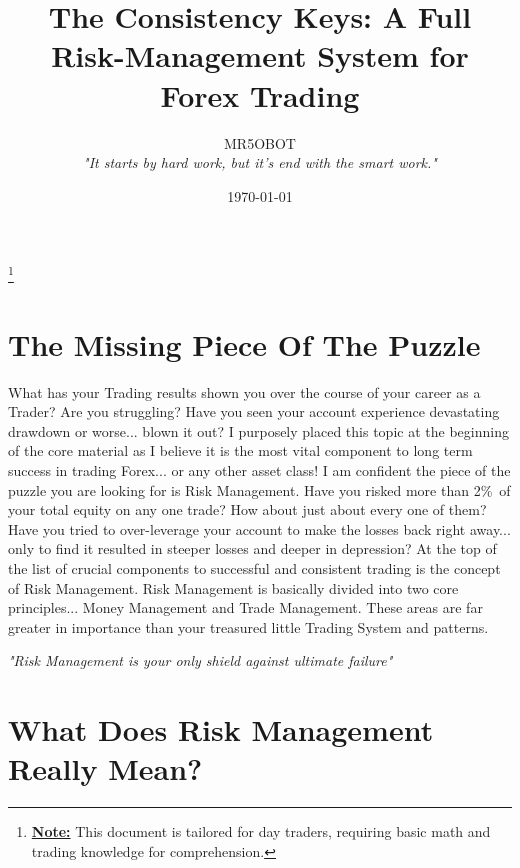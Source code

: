 \documentclass[10pt] {article}
\title{The Consistency Keys: A  Full Risk-Management System for Forex Trading}
\author{MR5OBOT \\ \textit{"It starts by hard work, but it's end with the smart work."}}
\begin{document}
\date{\today}
\maketitle
\pagestyle{fancy}
\tableofcontents 

\footnote{
  \textbf{\underline{Note:}}
  \small{This document is tailored for day traders, requiring basic math and trading knowledge for comprehension.}
}
\newpage
\section{The Missing Piece Of The Puzzle}
What has your Trading results shown you over the course of your career as a Trader? Are you struggling? Have you seen your account experience devastating drawdown or worse... blown it out? I purposely placed this topic at the beginning of the core material as I believe it is the most vital component to long term success in trading Forex... or any other asset class! I am confident the piece of the puzzle you are looking for is Risk Management. Have you risked more than 2\%\ of your total equity on any one trade? How about just about every one of them? Have you tried to over-leverage your account to make the losses back right away... only to find it resulted in steeper losses and deeper in depression? At the top of the list of crucial components to successful and consistent trading is the concept of Risk Management. Risk Management is basically divided into two core principles... Money Management and Trade Management. These areas are far greater in importance than your treasured little Trading System and patterns.

\vspace{0.3cm}
\begin{center}
  \textit{"Risk Management is your only shield against ultimate failure"}
\end{center}

\section{What Does Risk Management Really Mean?}
\end{document}
